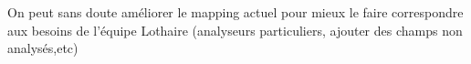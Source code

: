 On peut sans doute améliorer le mapping actuel pour mieux le faire correspondre aux
besoins de l'équipe Lothaire (analyseurs particuliers, ajouter des champs non analysés,etc)


%
